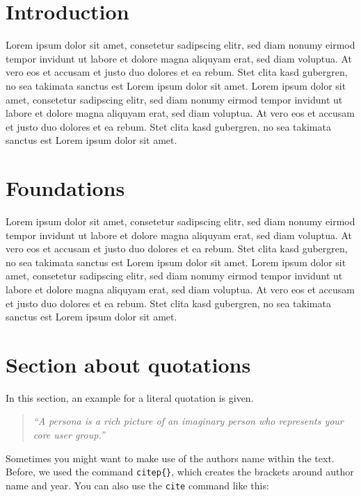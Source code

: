 \documentclass[a4paper]{article}
\begin{document}
\section{Introduction} %
\label{sec:introduction}
Lorem ipsum dolor sit amet, consetetur sadipscing elitr, sed diam nonumy eirmod tempor invidunt ut labore et dolore magna aliquyam erat, sed diam voluptua. \citep{Stanford09} At vero eos et accusam et justo duo dolores et ea rebum. Stet clita kasd gubergren, no sea takimata sanctus est Lorem ipsum dolor sit amet. Lorem ipsum dolor sit amet, consetetur sadipscing elitr, sed diam nonumy eirmod tempor invidunt ut labore et dolore magna aliquyam erat, sed diam voluptua. At vero eos et accusam et justo duo dolores et ea rebum. Stet clita kasd gubergren, no sea takimata sanctus est Lorem ipsum dolor sit amet.

\section{Foundations} %
\label{sec:foundations}
Lorem ipsum dolor sit amet, consetetur sadipscing elitr, sed diam nonumy eirmod tempor invidunt ut labore et dolore magna aliquyam erat, sed diam voluptua. At vero eos et accusam et justo duo dolores et ea rebum. Stet clita kasd gubergren, no sea takimata sanctus est Lorem ipsum dolor sit amet. Lorem ipsum dolor sit amet, consetetur sadipscing elitr, sed diam nonumy eirmod tempor invidunt ut labore et dolore magna aliquyam erat, sed diam voluptua. At vero eos et accusam et justo duo dolores et ea rebum. Stet clita kasd gubergren, no sea takimata sanctus est Lorem ipsum dolor sit amet.

\section{Section about quotations} %
\label{sec:section_about_quotations}

In this section, an example for a literal quotation is given. 

\begin{quotation}
	\emph{``A persona is a rich picture of an imaginary person who represents your core user group.''}
	\citep{Dix04}
\end{quotation}

Sometimes you might want to make use of the authors name within the text. Before, we used the command \texttt{citep\{\}}, which creates the brackets around author name and year. You can also use the \texttt{cite} command like this: \\
\end{document}
